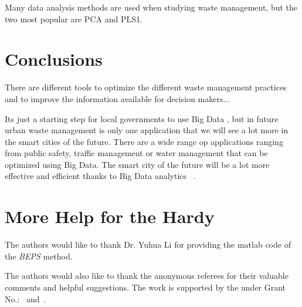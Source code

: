 \documentclass[sigconf]{acmart}
\begin{document}
Many data analysis methods are used when studying waste management, but the two most popular are PCA and PLS1. 
~\cite{bohm2013}




\section{Conclusions}

There are different tools to optimize the different waste management practices  and to improve the information available for decision makers...

Its just a starting step for local governments to use Big Data , but in future urban waste management is only one application that we will see a lot more in the smart cities of the future. There are a wide range op applications ranging from public safety, traffic management or water management that can be optimized using Big Data. The smart city of the future will be a lot more effective and efficient thanks to Big Data analytics ~\cite{markvan2016}.

\appendix



\section{More Help for the Hardy}
\appendix





\begin{acks}

  The authors would like to thank Dr. Yuhua Li for providing the
  matlab code of the \textit{BEPS} method.

  The authors would also like to thank the anonymous referees for
  their valuable comments and helpful suggestions. The work is
  supported by the  under Grant
  No.:~
  and~.

\end{acks}


 
\end{document}
